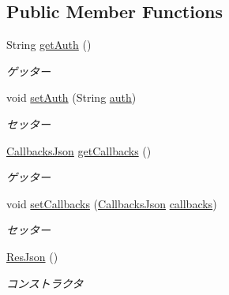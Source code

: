 \subsection*{Public Member Functions}
\begin{DoxyCompactItemize}
\item 
String \mbox{\hyperlink{classjp_1_1gr_1_1java__conf_1_1yuta__yoshinaga_1_1reversi_1_1model_1_1_res_json_ae9ce58a56ca0b5302efb00692e1e78d4}{get\+Auth}} ()
\begin{DoxyCompactList}\small\item\em ゲッター \end{DoxyCompactList}\item 
void \mbox{\hyperlink{classjp_1_1gr_1_1java__conf_1_1yuta__yoshinaga_1_1reversi_1_1model_1_1_res_json_aec94a5246bf7245af19f8f72100e986c}{set\+Auth}} (String \mbox{\hyperlink{classjp_1_1gr_1_1java__conf_1_1yuta__yoshinaga_1_1reversi_1_1model_1_1_res_json_a025a6255e8c44b7a6c1e1503e1195e84}{auth}})
\begin{DoxyCompactList}\small\item\em セッター \end{DoxyCompactList}\item 
\mbox{\hyperlink{classjp_1_1gr_1_1java__conf_1_1yuta__yoshinaga_1_1reversi_1_1model_1_1_callbacks_json}{Callbacks\+Json}} \mbox{\hyperlink{classjp_1_1gr_1_1java__conf_1_1yuta__yoshinaga_1_1reversi_1_1model_1_1_res_json_a1bd6cdcfb3ea59616409b5aae1d408e2}{get\+Callbacks}} ()
\begin{DoxyCompactList}\small\item\em ゲッター \end{DoxyCompactList}\item 
void \mbox{\hyperlink{classjp_1_1gr_1_1java__conf_1_1yuta__yoshinaga_1_1reversi_1_1model_1_1_res_json_a2c93a1f6a03a04909da59238c7e68ca3}{set\+Callbacks}} (\mbox{\hyperlink{classjp_1_1gr_1_1java__conf_1_1yuta__yoshinaga_1_1reversi_1_1model_1_1_callbacks_json}{Callbacks\+Json}} \mbox{\hyperlink{classjp_1_1gr_1_1java__conf_1_1yuta__yoshinaga_1_1reversi_1_1model_1_1_res_json_a39c4406106b7bfae1aeb9c56f4a51f46}{callbacks}})
\begin{DoxyCompactList}\small\item\em セッター \end{DoxyCompactList}\item 
\mbox{\hyperlink{classjp_1_1gr_1_1java__conf_1_1yuta__yoshinaga_1_1reversi_1_1model_1_1_res_json_ac67902ff0ff40d4b25e3ded78b5098a2}{Res\+Json}} ()
\begin{DoxyCompactList}\small\item\em コンストラクタ \end{DoxyCompactList}\end{DoxyCompactItemize}
